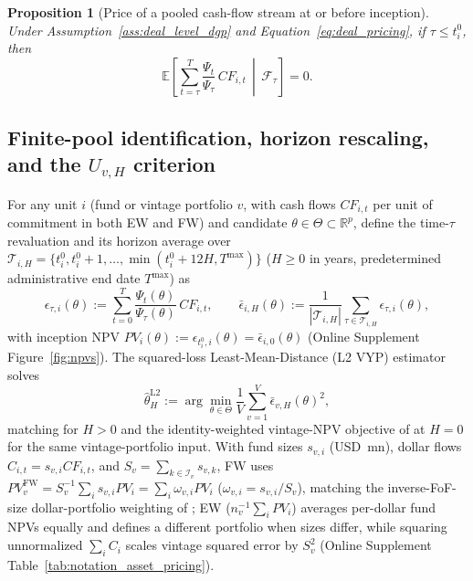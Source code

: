 \documentclass[12pt]{article}
\newtheorem{proposition}{Proposition}
\begin{document}
\begin{proposition}[Price of a pooled cash-flow stream at or before inception]
\label{theo:inception_value}
Under Assumption~\ref{ass:deal_level_dgp} and Equation~\eqref{eq:deal_pricing}, if $\tau \le t_i^0$, then
\begin{equation}
\label{eq:price_pooled_cash_flows}
\mathbb{E}\!\left[\sum_{t=\tau}^{T} \frac{\Psi_t}{\Psi_\tau}\,CF_{i,t} \,\middle|\, \mathcal{F}_\tau\right] = 0.
\end{equation}
\end{proposition}

\subsection{Finite-pool identification, horizon rescaling, and the $U_{v,H}$ criterion}
\label{sec:fundwise_lmd_estimator}

For any unit $i$ (fund or vintage portfolio $v$, with cash flows $CF_{i,t}$ per unit of commitment in both EW and FW) and candidate $\theta \in \Theta \subset \mathbb{R}^p$, define the time-$\tau$ revaluation and its horizon average over $\mathcal{T}_{i,H} = \{t_i^0, t_i^0+1, \dots, \min(t_i^0 + 12H, T^{\max})\}$ ($H \ge 0$ in years, predetermined administrative end date $T^{\max}$) as
\begin{equation}
\label{eq:average_pricing_error}
\epsilon_{\tau,i}(\theta) := \sum_{t=0}^{T} \frac{\Psi_t(\theta)}{\Psi_\tau(\theta)}\,CF_{i,t},
\qquad
\bar\epsilon_{i,H}(\theta) := \frac{1}{|\mathcal{T}_{i,H}|} \sum_{\tau \in \mathcal{T}_{i,H}} \epsilon_{\tau,i}(\theta),
\end{equation}
with inception NPV $PV_i(\theta) := \epsilon_{t_i^0,i}(\theta) = \bar\epsilon_{i,0}(\theta)$ (Online Supplement Figure~\ref{fig:npvs}).
The squared-loss Least-Mean-Distance (L2 VYP) estimator solves
\begin{equation}
\label{eq:estimator_H}
\hat\theta_{H}^{\mathrm{L2}} := \arg\min_{\theta \in \Theta} \frac{1}{V} \sum_{v=1}^{V} \bar\epsilon_{v,H}(\theta)^2,
\end{equation}
matching \citet[eq.~4]{TP24} for $H > 0$ and the identity-weighted vintage-NPV objective of \citet[eqs.~3--4]{DLP12} at $H = 0$ for the same vintage-portfolio input.
With fund sizes $s_{v,i}$ (USD~mn), dollar flows $C_{i,t} = s_{v,i} CF_{i,t}$, and $S_v = \sum_{k \in \mathcal{I}_v} s_{v,k}$, FW uses $PV_v^{\mathrm{FW}} = S_v^{-1}\sum_i s_{v,i} PV_i = \sum_i \omega_{v,i} PV_i$ ($\omega_{v,i} = s_{v,i}/S_v$), matching the inverse-FoF-size dollar-portfolio weighting of \citet[Table~7, p.~533]{DLP12}; EW ($n_v^{-1}\sum_i PV_i$) averages per-dollar fund NPVs equally and defines a different portfolio when sizes differ, while squaring unnormalized $\sum_i C_i$ scales vintage squared error by $S_v^2$ (Online Supplement Table~\ref{tab:notation_asset_pricing}).
\end{document}
